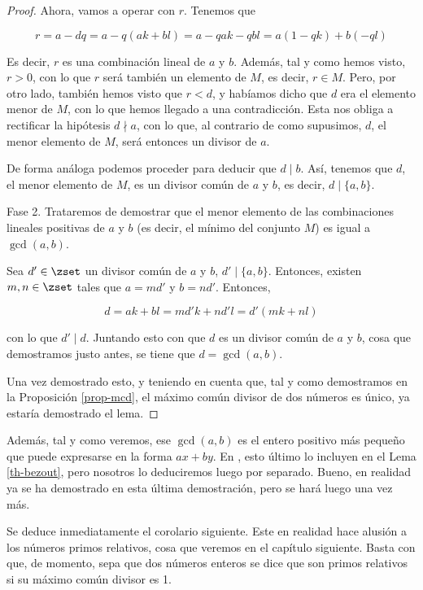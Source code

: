 \begin{proof}
  Ahora, vamos a operar con $r$. Tenemos que

  $$ r = a - dq = a - q(ak + bl) = a - qak - qbl = a(1 - qk) + b(-ql) $$

  \noindent Es decir, $r$ es una combinación lineal de $a$ y $b$. Además,
  tal y como hemos visto, $r > 0$, con lo que $r$ será también un elemento
  de $M$, es decir, $r \in M$. Pero, por otro lado, también hemos visto que
  $r < d$, y habíamos dicho que $d$ era el elemento menor de $M$, con lo que
  hemos llegado a una contradicción. Esta nos obliga a rectificar la
  hipótesis $d \nmid a$, con lo que, al contrario de como supusimos, $d$, el
  menor elemento de $M$, será entonces un divisor de $a$.

  De forma análoga podemos proceder para deducir que $d \mid b$. Así,
  tenemos que $d$, el menor elemento de $M$, es un divisor común de $a$ y
  $b$, es decir, $d \mid \{a, b\}$.

  Fase 2. Trataremos de demostrar que el menor elemento de las combinaciones
  lineales positivas de $a$ y $b$ (es decir, el mínimo del conjunto $M$) es
  igual a $\gcd(a, b)$.

  Sea $d' \in \zset$ un divisor común de $a$ y $b$, $d' \mid \{a, b\}$.
  Entonces, existen $m, n \in \zset$ tales que $a = md'$ y $b = nd'$.
  Entonces,

  $$ d = ak + bl = md'k + nd'l = d'(mk + nl)$$

  \noindent con lo que $d' \mid d$. Juntando esto con que $d$ es un divisor
  común de $a$ y $b$, cosa que demostramos justo antes, se tiene que $d =
  \gcd(a, b)$.

  Una vez demostrado esto, y teniendo en cuenta que, tal y como demostramos
  en la Proposición \ref{prop-mcd}, el máximo común divisor de dos números
  es único, ya estaría demostrado el lema.
\end{proof}

Además, tal y como veremos, ese $\gcd(a, b)$ es el entero positivo más
pequeño que puede expresarse en la forma $ax + by$. En \cite{texto-uned},
esto último lo incluyen en el Lema \ref{th-bezout}, pero nosotros lo
deduciremos luego por separado. Bueno, en realidad ya se ha demostrado en
esta última demostración, pero se hará luego una vez más.

Se deduce inmediatamente el corolario siguiente. Este en realidad hace
alusión a los números primos relativos, cosa que veremos en el capítulo
siguiente. Basta con que, de momento, sepa que dos números enteros se dice
que son primos relativos si su máximo común divisor es 1.

